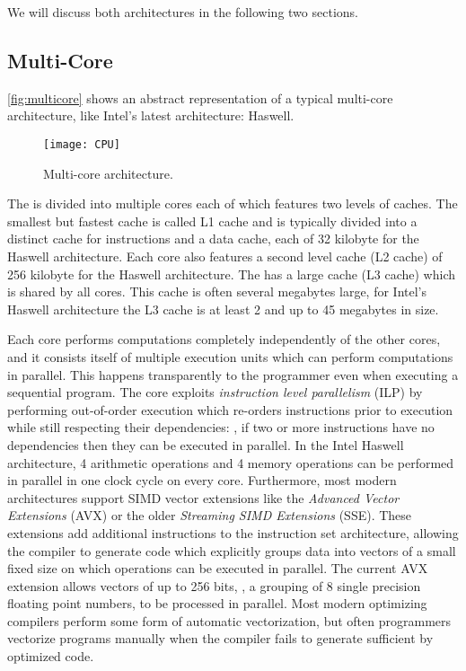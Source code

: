 We will discuss both architectures in the following two sections.

\subsection{Multi-Core \CPUs}
\autoref{fig:multicore} shows an abstract representation of a typical multi-core \CPU architecture, like Intel's latest \CPU architecture: Haswell.
\begin{figure}
  \centering
  \texttt{[image: CPU]}
  \caption{Multi-core \CPU architecture.}
  \label{fig:multicore}
\end{figure}
The \CPU is divided into multiple cores each of which features two levels of caches.
The smallest but fastest cache is called L1 cache and is typically divided into a distinct cache for instructions and a data cache, each of 32 kilobyte for the Haswell architecture.
Each core also features a second level cache (L2 cache) of 256 kilobyte for the Haswell architecture.
The \CPU has a large cache (L3 cache) which is shared by all cores.
This cache is often several megabytes large, for Intel's Haswell architecture the L3 cache is at least 2 and up to 45 megabytes in size.

Each \CPU core performs computations completely independently of the other cores, and it consists itself of multiple execution units which can perform computations in parallel.
This happens transparently to the programmer even when executing a sequential program.
The \CPU core exploits \emph{instruction level parallelism} (ILP) by performing out-of-order execution which re-orders instructions prior to execution while still respecting their dependencies:
\eg, if two or more instructions have no dependencies then they can be executed in parallel.
In the Intel Haswell architecture, 4 arithmetic operations and 4 memory operations can be performed in parallel in one clock cycle on every core.
Furthermore, most modern \CPU architectures support SIMD vector extensions like the \emph{Advanced Vector Extensions} (AVX) or the older \emph{Streaming SIMD Extensions} (SSE).
These extensions add additional instructions to the instruction set architecture, allowing the compiler to generate code which explicitly groups data into vectors of a small fixed size on which operations can be executed in parallel.
The current AVX extension allows vectors of up to 256 bits, \eg, a grouping of 8 single precision floating point numbers, to be processed in parallel.
Most modern optimizing compilers perform some form of automatic vectorization, but often programmers vectorize programs manually when the compiler fails to generate sufficient by optimized code.

